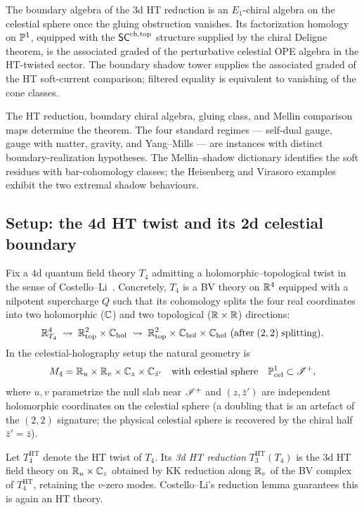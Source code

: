 The boundary algebra of the $3$d HT reduction is an $E_1$-chiral
algebra on the celestial sphere once the gluing obstruction vanishes.
Its factorization homology on $\mathbb P^1$, equipped with the $\mathsf{SC}^{\mathrm{ch,top}}$
structure supplied by the chiral Deligne theorem, is the associated
graded of the perturbative celestial OPE algebra in the HT-twisted
sector. The boundary shadow tower supplies the associated graded of the
HT soft-current comparison; filtered equality is equivalent to
vanishing of the cone classes.

The HT reduction, boundary chiral algebra, gluing class, and Mellin
comparison maps determine the theorem. The four standard regimes ---
self-dual gauge, gauge with matter, gravity, and Yang--Mills --- are
instances with distinct boundary-realization hypotheses. The
Mellin--shadow dictionary identifies the soft residues with
bar-cohomology classes; the Heisenberg and Virasoro examples
exhibit the two extremal shadow behaviours.

\subsection{Setup: the 4d HT twist and its 2d celestial boundary}
\label{subsec:uch-setup}

Fix a $4$d quantum field theory $T_4$ admitting a holomorphic--topological
twist in the sense of Costello--Li~\cite{CL16,
CL16}. Concretely, $T_4$ is a BV theory on $\mathbb R^4$
equipped with a nilpotent supercharge $Q$ such that its cohomology
splits the four real coordinates into two holomorphic ($\mathbb C$) and two
topological ($\mathbb R \times \mathbb R$) directions:
\[
\mathbb R^4_{T_4}
\;\leadsto\;
\mathbb R^2_{\text{top}} \times \mathbb C_{\text{hol}}
\;\leadsto\;
\mathbb R^2_{\text{top}} \times \mathbb C_{\text{hol}} \times \mathbb C_{\text{hol}}
\text{ (after}\;(2,2)\;\text{splitting)}.
\]
In the celestial-holography setup the natural geometry is
\begin{equation}
\label{eq:uch-geometry}
M_4 = \mathbb R_u \times \mathbb R_v \times \mathbb C_z \times \mathbb C_{\bar z'}
\quad\text{with celestial sphere}\quad
\mathbb P^1_{\text{cel}} \subset \mathscr I^+,
\end{equation}
where $u, v$ parametrize the null slab near $\mathscr I^+$ and $(z, \bar z')$
are independent holomorphic coordinates on the celestial sphere (a
doubling that is an artefact of the $(2,2)$ signature; the physical
celestial sphere is recovered by the chiral half
$\bar z' = \bar z$).

\begin{definition}
\label{def:uch-ht-twist}
Let $T_4^{\mathrm{HT}}$ denote the HT twist of $T_4$. Its \emph{3d HT
reduction} $T_3^{\mathrm{HT}}(T_4)$ is the $3$d HT field theory on
$\mathbb R_u \times \mathbb C_z$ obtained by KK reduction along $\mathbb R_v$ of the
BV complex of $T_4^{\mathrm{HT}}$, retaining the $v$-zero modes.
Costello--Li's reduction lemma
\cite[Thm.~6.2]{CL16} guarantees this is again an
HT theory.
\end{definition}

